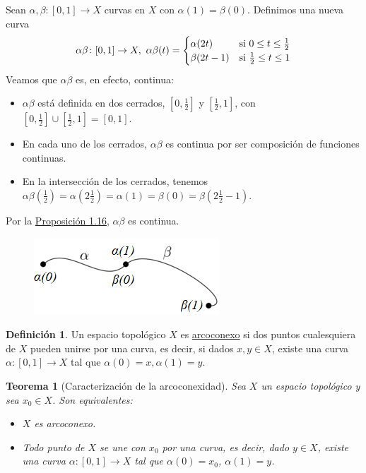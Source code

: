 \documentclass[12pt]{report}
\newtheorem{theorem}{Teorema}[chapter]
\theoremstyle{definition}
\newtheorem{definition}{Definición}[chapter]
\theoremstyle{definition}
\theoremstyle{remark}
\begin{document}
\vspace{2mm}
Sean $\alpha, \beta \colon [0,1] \to X$ curvas en $X$ con $\alpha(1) = \beta(0)$. Definimos una nueva curva 
\[
\alpha\beta \colon [0,1] \to X, \ \alpha\beta(t) = \begin{cases}
    \alpha(2t)  & $si$ \ 0 \leq t \leq \frac{1}{2} \\ 
    \beta(2t-1) & $si$ \ \frac{1}{2} \leq t \leq 1
\end{cases}
\]
Veamos que $\alpha\beta$ es, en efecto, continua:
\begin{itemize}
    \item $\alpha\beta$ está definida en dos cerrados, $[0, \frac{1}{2}]$ y $[\frac{1}{2},1]$, con $[0, \frac{1}{2}] \cup [\frac{1}{2},1] = [0,1]$.
    \item En cada uno de los cerrados, $\alpha\beta$ es continua por ser composición de funciones continuas.
    \item En la intersección de los cerrados, tenemos $\alpha\beta(\frac{1}{2}) = \alpha(2\frac{1}{2}) = \alpha(1) = \beta(0) = \beta(2\frac{1}{2}-1)$.
\end{itemize}

Por la \hyperref[prop1.16.]{\color{blue}Proposición 1.16}, $\alpha\beta$ es continua.

\begin{figure}[h]
\includegraphics[scale = 1.0]{def2.2}
\centering
\end{figure}

\vspace{2mm}
\begin{definition}
Un espacio topológico $X$ es \underline{arcoconexo} si dos puntos cualesquiera de $X$ pueden unirse por una curva, es decir, si dados $x,y \in X$, existe una curva $\alpha \colon [0,1] \to X$ tal que $\alpha(0) = x, \alpha(1) = y$.
\end{definition}

\begin{theorem}[Caracterización de la arcoconexidad]
\label{teo2.6.}
Sea $X$ un espacio topológico y sea $x_0 \in X$. Son equivalentes:
\begin{itemize}
    \item[(i)] $X$ es arcoconexo.
    \item[(ii)] Todo punto de $X$ se une con $x_0$ por una curva, es decir, dado $y \in X$, existe una curva $\alpha \colon [0,1] \to X$ tal que $\alpha(0) = x_0$, $\alpha(1) = y$.
\end{itemize}
\end{theorem}
\end{document}
